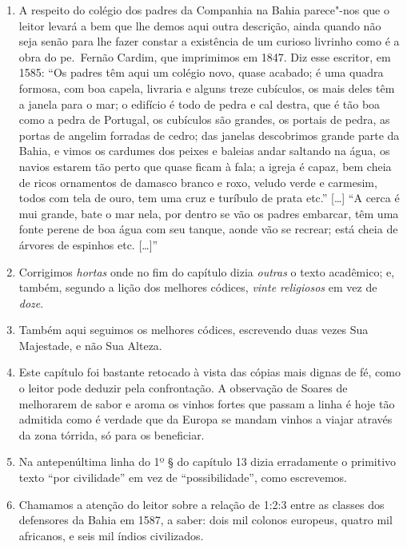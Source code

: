 \begin{enumerate}
\item  A respeito do colégio dos padres da Companhia na Bahia parece"-nos
que o leitor levará a bem que lhe demos aqui outra descrição, ainda quando
não seja senão para lhe fazer constar a existência de um curioso livrinho
como é a obra do pe.~Fernão Cardim, que imprimimos em 1847.
Diz esse escritor, em 1585: ``Os padres têm aqui um colégio novo, quase acabado; é 
uma quadra formosa, com boa capela, livraria e alguns treze cubículos, os mais deles têm a 
janela para o mar; o edifício é todo de pedra e cal destra, que é tão boa como a pedra de 
Portugal, os cubículos são grandes, os portais de pedra, as portas de angelim forradas de 
cedro; das janelas descobrimos grande parte da Bahia, e vimos os cardumes dos peixes e 
baleias andar saltando na água, os navios estarem tão perto que quase ficam à fala; a igreja é 
capaz, bem cheia de ricos ornamentos de damasco branco e roxo, veludo verde e carmesim, 
todos com tela de ouro, tem uma cruz e turíbulo de prata etc.'' [\ldots] 
``A cerca é mui grande, bate o mar nela, por dentro se vão os padres embarcar, têm uma 
fonte perene de boa água com seu tanque, aonde vão se recrear; está cheia de árvores de 
espinhos etc. [\ldots]''

\item Corrigimos \textit{hortas} onde no fim do capítulo dizia \textit{outras} o texto acadêmico; e, 
também, segundo a lição dos melhores códices, \textit{vinte religiosos}  em vez de \textit{doze}. 

\item Também aqui seguimos os melhores códices, escrevendo duas vezes Sua Majestade, 
e não Sua Alteza.

\item Este capítulo foi bastante retocado à vista das cópias mais dignas de fé, como o 
leitor pode deduzir pela confrontação. A observação de Soares de melhorarem de sabor 
e aroma os vinhos fortes que passam a linha é hoje tão admitida como é verdade que da 
Europa se mandam vinhos a viajar através da zona tórrida, só para os beneficiar.

\item Na antepenúltima linha do 1º § do capítulo 13 dizia erradamente o primitivo texto 
``por civilidade''  em vez de ``possibilidade'',  como escrevemos.

\item Chamamos a atenção do leitor sobre a relação de 1:2:3 entre as classes dos 
defensores da Bahia em 1587, a saber: dois mil colonos europeus, quatro mil africanos, 
e seis mil índios civilizados.


\end{enumerate}
